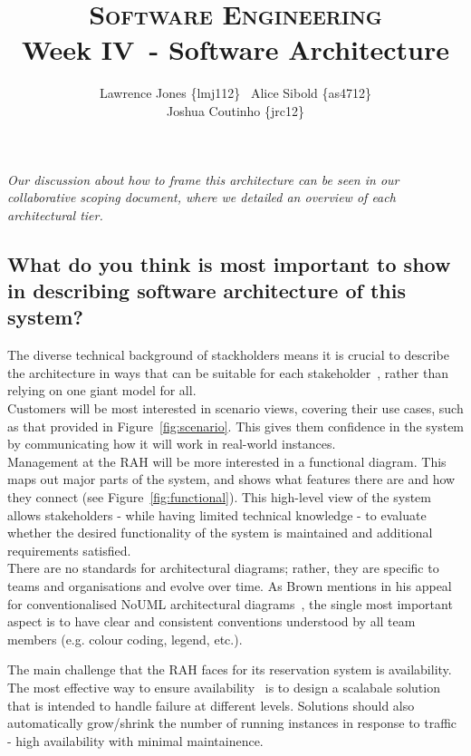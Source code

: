 \documentclass[11pt]{article}
\title{\textsc{Software Engineering}\\Week IV~- Software Architecture}
\author{Lawrence Jones \{lmj112\} \  Alice Sibold \{as4712\} \\
        Joshua Coutinho \{jrc12\}}
\date{}
\begin{document}
\maketitle


\textit{Our discussion about how to frame this architecture can be seen in our
collaborative scoping document\cite{scoping}, where we detailed an overview of
each architectural tier.}

\subsection*{What do you think is most important to show in describing software
architecture of this system?}

The diverse technical background of stackholders means it is crucial to describe
the architecture in ways that can be suitable for each
stakeholder~\cite{rozanski}, rather than relying on one giant model for all.\\

Customers will be most interested in scenario views, covering their use cases,
such as that provided in Figure~\ref{fig:scenario}. This gives them confidence
in the system by communicating how it will work in real-world instances.\\

Management at the RAH will be more interested in a functional diagram. This maps
out major parts of the system, and shows what features there are and how they
connect (see Figure~\ref{fig:functional}). This high-level view of the system
allows stakeholders - while having limited technical knowledge - to evaluate
whether the desired functionality of the system is maintained and additional
requirements satisfied.\\

There are no standards for architectural diagrams; rather, they are specific to
teams and organisations and evolve over time. As Brown mentions in his appeal
for conventionalised NoUML architectural diagrams~\cite{brown}, the single most
important aspect is to have clear and consistent conventions understood by all
team members (e.g. colour coding, legend, etc.).

The main challenge that the RAH faces for its reservation system is
availability. The most effective way to ensure availability~\cite{bot} is to
design a scalabale solution~\cite{prom} that is intended to handle failure at
different levels. Solutions should also automatically grow/shrink the number of
running instances in response to traffic - high availability with minimal
maintainence. \\
\end{document}
